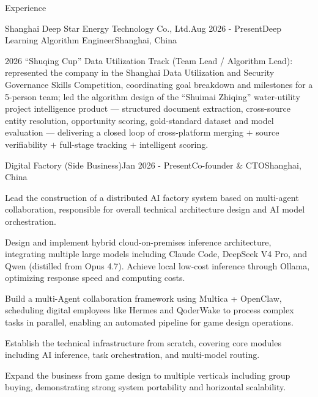 \documentclass{resume} %
\begin{document}
\begin{rSection}{Experience}
\begin{rSubsection}{Shanghai Deep Star Energy Technology Co., Ltd.}{Aug 2026 - Present}{Deep Learning Algorithm Engineer}{Shanghai, China}
        \item 2026 ``Shuqing Cup'' Data Utilization Track (Team Lead / Algorithm Lead): represented the company in the Shanghai Data Utilization and Security Governance Skills Competition, coordinating goal breakdown and milestones for a 5-person team; led the algorithm design of the ``Shuimai Zhiqing'' water-utility project intelligence product --- structured document extraction, cross-source entity resolution, opportunity scoring, gold-standard dataset and model evaluation --- delivering a closed loop of cross-platform merging $+$ source verifiability $+$ full-stage tracking $+$ intelligent scoring.
    \end{rSubsection}

    \begin{rSubsection}{Digital Factory (Side Business)}{Jan 2026 - Present}{Co-founder \& CTO}{Shanghai, China}
        \item Lead the construction of a distributed AI factory system based on multi-agent collaboration, responsible for overall technical architecture design and AI model orchestration.
        \item Design and implement hybrid cloud-on-premises inference architecture, integrating multiple large models including Claude Code, DeepSeek V4 Pro, and Qwen (distilled from Opus 4.7). Achieve local low-cost inference through Ollama, optimizing response speed and computing costs.
        \item Build a multi-Agent collaboration framework using Multica + OpenClaw, scheduling digital employees like Hermes and QoderWake to process complex tasks in parallel, enabling an automated pipeline for game design operations.
        \item Establish the technical infrastructure from scratch, covering core modules including AI inference, task orchestration, and multi-model routing.
        \item Expand the business from game design to multiple verticals including group buying, demonstrating strong system portability and horizontal scalability.
    \end{rSubsection}


\end{rSection}
\end{document}
